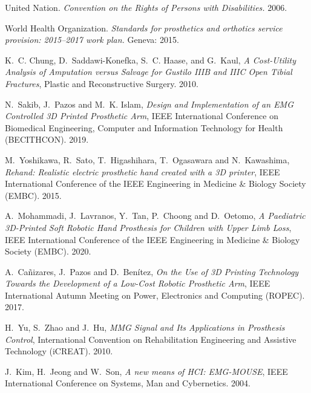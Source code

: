 \documentclass[conference]{IEEEtran}
\begin{document}
\ifCLASSOPTIONcaptionsoff
  \newpage
\fi



\begin{thebibliography}{1}


United Nation. \emph{Convention on the Rights of Persons with Disabilities.} 2006.

World Health Organization. \emph{Standards for prosthetics and orthotics service provision: 2015–2017 work plan.} Geneva: 2015.

K.~C. Chung, D.~Saddawi-Konefka, S.~C. Haase, and G.~Kaul, \emph{A Cost-Utility Analysis of Amputation versus Salvage for Gustilo IIIB and IIIC Open Tibial Fractures}, Plastic and Reconstructive Surgery. 2010.

N.~Sakib, J.~Pazos and M.~K. Islam, \emph{Design and Implementation of an EMG Controlled 3D Printed Prosthetic Arm}, IEEE International Conference on Biomedical Engineering, Computer and Information Technology for Health (BECITHCON). 2019.

M.~Yoshikawa, R.~Sato, T.~Higashihara, T.~Ogasawara and N.~Kawashima, \emph{Rehand: Realistic electric prosthetic hand created with a 3D printer}, IEEE International Conference of the IEEE Engineering in Medicine & Biology Society (EMBC). 2015.

A.~Mohammadi, J.~Lavranos, Y.~Tan, P.~Choong and D.~Oetomo, \emph{A Paediatric 3D-Printed Soft Robotic Hand Prosthesis for Children with Upper Limb Loss}, IEEE International Conference of the IEEE Engineering in Medicine & Biology Society (EMBC). 2020.

A.~Cañizares, J.~Pazos and D.~Benítez, \emph{On the Use of 3D Printing Technology Towards the
Development of a Low-Cost Robotic Prosthetic Arm}, IEEE International Autumn Meeting on Power, Electronics and Computing (ROPEC). 2017.

H.~Yu, S.~Zhao and J.~Hu, \emph{MMG Signal and Its Applications in Prosthesis Control}, International Convention on Rehabilitation Engineering and Assistive Technology (iCREAT). 2010.

J.~Kim, H.~Jeong and W.~Son, \emph{A new means of HCI: EMG-MOUSE}, IEEE International Conference on Systems, Man and Cybernetics. 2004.


\end{thebibliography}
\end{document}
